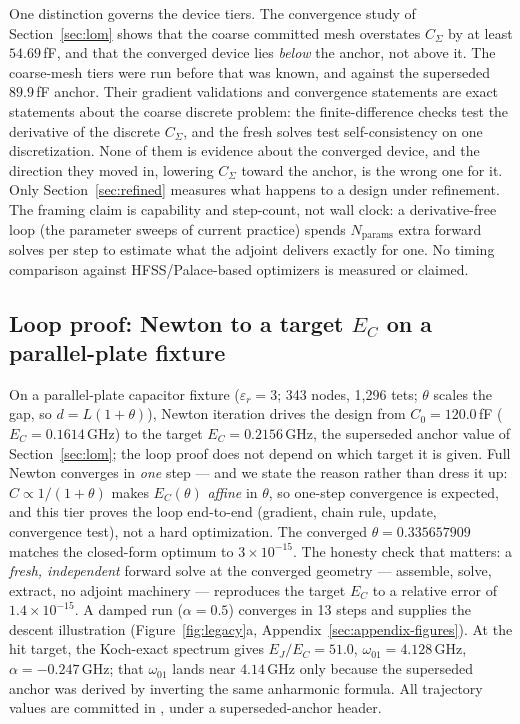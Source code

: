 \documentclass{anvil-paper}
\begin{document}
One distinction governs the device tiers. The convergence study of
Section~\ref{sec:lom} shows that the coarse committed mesh overstates
$C_\Sigma$ by at least $54.69$\,fF, and that the converged device lies
\emph{below} the anchor, not above it. The coarse-mesh tiers
were run before that was known, and against the superseded
$89.9$\,fF anchor. Their gradient validations and
convergence statements are exact statements about the coarse discrete
problem: the finite-difference checks test the derivative of the
discrete $C_\Sigma$, and the fresh solves test self-consistency on one
discretization. None of them is evidence about the converged device,
and the direction they moved in, lowering $C_\Sigma$ toward the anchor,
is the wrong one for it. Only Section~\ref{sec:refined} measures what
happens to a design under refinement. The framing claim is
capability and step-count, not wall clock: a derivative-free loop
(the parameter sweeps of current practice) spends $N_{\mathrm{params}}$
extra forward solves per step to estimate what the adjoint delivers
exactly for one. No timing comparison against HFSS/Palace-based
optimizers is measured or claimed.

\subsection{Loop proof: Newton to a target \texorpdfstring{$E_C$}{E\_C} on a parallel-plate
fixture}
\label{sec:optdemo-plate}

On a parallel-plate capacitor fixture ($\varepsilon_r = 3$; 343 nodes,
1{,}296 tets; $\theta$ scales the gap, so $d = L(1+\theta)$), Newton
iteration drives the design from $C_0 = 120.0$\,fF ($E_C =
0.1614$\,GHz) to the target $E_C = 0.2156$\,GHz, the superseded anchor
value of Section~\ref{sec:lom}; the loop proof does not depend on which
target it is given. Full
Newton converges in \emph{one} step --- and we state the reason rather
than dress it up: $C \propto 1/(1+\theta)$ makes $E_C(\theta)$
\emph{affine} in $\theta$, so one-step convergence is expected, and this
tier proves the loop end-to-end (gradient, chain rule, update,
convergence test), not a hard optimization. The converged $\theta =
0.335657909$ matches the closed-form optimum to $3\times10^{-15}$. The
honesty check that matters: a \emph{fresh, independent} forward solve at
the converged geometry --- assemble, solve, extract, no adjoint machinery
--- reproduces the target $E_C$ to a relative error of
$1.4\times10^{-15}$. A damped run ($\alpha = 0.5$) converges in 13 steps
and supplies the descent illustration
(Figure~\ref{fig:legacy}a, Appendix~\ref{sec:appendix-figures}). At the hit target, the Koch-exact spectrum
gives $E_J/E_C = 51.0$, $\omega_{01} = 4.128$\,GHz, $\alpha =
-0.247$\,GHz; that $\omega_{01}$ lands near $4.14$\,GHz only because the
superseded anchor was derived by inverting the same anharmonic formula.
All trajectory values are committed in
, under a
superseded-anchor header.
\end{document}
